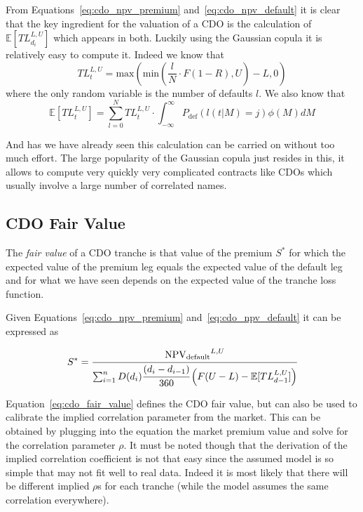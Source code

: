 From Equations~\ref{eq:cdo_npv_premium} and~\ref{eq:cdo_npv_default} it is clear that the key ingredient for the valuation of a CDO is the calculation of $\mathbb{E}[TL_{d_i}^{L,U}]$ which appears in both. Luckily using the Gaussian copula it is relatively easy to compute it. Indeed we know that 
\begin{equation}
TL_{t}^{L,U}=\mathrm{max}(\mathrm{min}(\frac{l}{N}\cdot F(1-R), U)-L, 0)
\label{eq:tl}
\end{equation}
where the only random variable is the number of defaults $l$. We also know that 
\begin{equation}
\mathbb{E}[TL_{t}^{L,U}] = \sum_{l=0}^{N}TL_{t}^{L,U}\cdot \int_{-\infty}^{\infty} P_{\mathrm{def}}(l(t|M)=j) \phi(M)dM
\label{eq:etl}
\end{equation}

And has we have already seen this calculation can be carried on without too much effort. The large popularity of the Gaussian copula just resides in this, it allows to compute very quickly very complicated contracts like CDOs which usually involve a large number of correlated names.

\subsection{CDO Fair Value}
The \emph{fair value} of a CDO tranche is that value of the premium $S^*$ for which the expected value of the premium leg equals the expected value of the default leg and for what we have seen depends on the expected value of the tranche loss function.

Given Equations~\ref{eq:cdo_npv_premium} and~\ref{eq:cdo_npv_default} it can be expressed as

\begin{equation}
S^* = \cfrac{\mathrm{NPV_{default}}^{L,U}}{\sum^{n}_{i=1}D(d_i)\cfrac{(d_i - d_{i-1})}{360}\left(F(U-L)-\mathbb{E}[TL_{d-1}^{L,U}]\right)}
\label{eq:cdo_fair_value}
\end{equation}

Equation~\ref{eq:cdo_fair_value} defines the CDO fair value, but can also be used to calibrate the implied correlation parameter from the market. This can be obtained by plugging into the equation the market premium value and solve for the correlation parameter $\rho$. It must be noted though that the derivation of the implied correlation coefficient is not that easy since the assumed model is so simple that may not fit well to real data. Indeed it is most likely that there will be different implied $\rho$s for each tranche (while the model assumes the same correlation everywhere).

